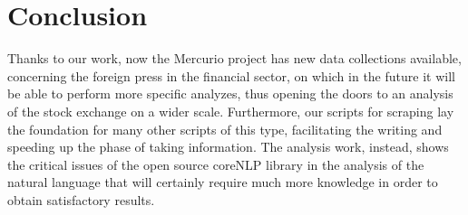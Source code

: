 \section{Conclusion}
Thanks to our work, now the Mercurio project has new data collections available, concerning the foreign press in the financial sector, on which in the future it will be able to perform more specific analyzes, thus opening the doors to an analysis of the stock exchange on a wider scale. Furthermore, our scripts for scraping lay the foundation for many other scripts of this type, facilitating the writing and speeding up the phase of taking information. The analysis work, instead, shows the critical issues of the open source coreNLP library in the analysis of the natural language that will certainly require much more knowledge in order to obtain satisfactory results.